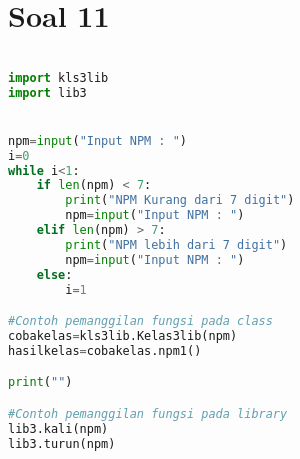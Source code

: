 \section*{Soal 11}
\begin{lstlisting}[language=Python]

import kls3lib
import lib3


npm=input("Input NPM : ")
i=0
while i<1:
    if len(npm) < 7:
        print("NPM Kurang dari 7 digit")
        npm=input("Input NPM : ")
    elif len(npm) > 7:
        print("NPM lebih dari 7 digit")
        npm=input("Input NPM : ")
    else:
        i=1

#Contoh pemanggilan fungsi pada class
cobakelas=kls3lib.Kelas3lib(npm) 
hasilkelas=cobakelas.npm1()

print("")

#Contoh pemanggilan fungsi pada library
lib3.kali(npm)
lib3.turun(npm)


\end{lstlisting}
